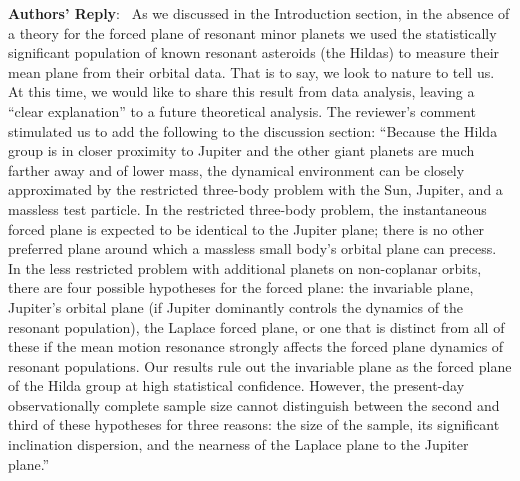\documentclass[11pt]{article}
\newcounter{reviewer}
\newenvironment{reply}
   {\medskip \noindent \begin{sf}\textbf{Authors' Reply}:\  }
   {\medskip \end{sf}\medskip}
\begin{document}
\begin{reply}
As we discussed in the Introduction section, in the absence of a theory for the forced plane of resonant minor planets we used the statistically significant population of known resonant asteroids (the Hildas) to measure their mean plane from their orbital data. 
That is to say, we look to nature to tell us. 
At this time, we would like to share this result from data analysis, leaving a “clear explanation” to a future theoretical analysis. 
The reviewer’s comment stimulated us to add the following to the discussion section:
``Because the Hilda group is in closer proximity to Jupiter and the other giant planets are much farther away and of lower mass, the dynamical environment can be closely approximated by the restricted three-body problem with the Sun, Jupiter, and a massless test particle.
In the restricted three-body problem, the instantaneous forced plane is expected to be identical to the Jupiter plane; there is no other preferred plane around which a massless small body's orbital plane can precess.
In the less restricted problem with additional planets on non-coplanar orbits, there are four possible hypotheses for the forced plane: the invariable plane, Jupiter's orbital plane (if Jupiter dominantly controls the dynamics of the resonant population), the Laplace forced plane, or one that is distinct from all of these if the mean motion resonance strongly affects the forced plane dynamics of resonant populations.
Our results rule out the invariable plane as the forced plane of the Hilda group at high statistical confidence.
However, the present-day observationally complete sample size cannot distinguish between the second and third of these hypotheses for three reasons: the size of the sample, its significant inclination dispersion, and the nearness of the Laplace plane to the Jupiter plane.''




\end{reply}
\end{document}
